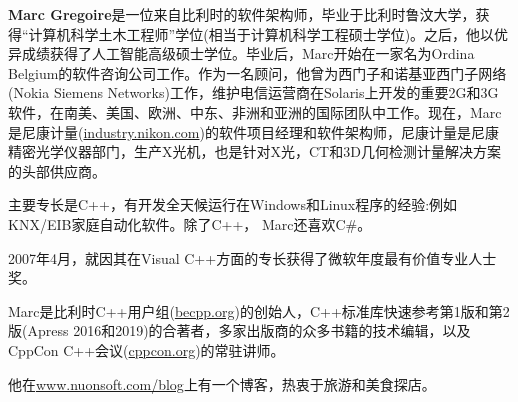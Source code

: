 \textbf{Marc Gregoire}是一位来自比利时的软件架构师，毕业于比利时鲁汶大学，获得“计算机科学土木工程师”学位(相当于计算机科学工程硕士学位)。之后，他以优异成绩获得了人工智能高级硕士学位。毕业后，Marc开始在一家名为Ordina Belgium的软件咨询公司工作。作为一名顾问，他曾为西门子和诺基亚西门子网络(Nokia Siemens Networks)工作，维护电信运营商在Solaris上开发的重要2G和3G软件，在南美、美国、欧洲、中东、非洲和亚洲的国际团队中工作。现在，Marc是尼康计量(\url{industry.nikon.com})的软件项目经理和软件架构师，尼康计量是尼康精密光学仪器部门，生产X光机，也是针对X光，CT和3D几何检测计量解决方案的头部供应商。

主要专长是C++，有开发全天候运行在Windows和Linux程序的经验:例如KNX/EIB家庭自动化软件。除了C++， Marc还喜欢C\#。

2007年4月，就因其在Visual C++方面的专长获得了微软年度最有价值专业人士奖。

Marc是比利时C++用户组(\url{becpp.org})的创始人，C++标准库快速参考第1版和第2版(Apress 2016和2019)的合著者，多家出版商的众多书籍的技术编辑，以及CppCon C++会议(\url{cppcon.org})的常驻讲师。

他在\url{www.nuonsoft.com/blog}上有一个博客，热衷于旅游和美食探店。